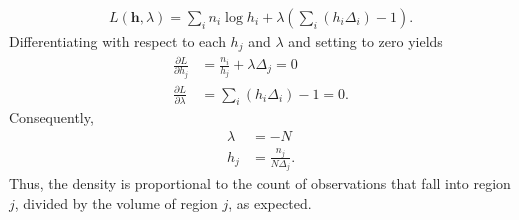\documentclass[]{article}
\begin{document}
\begin{enumerate}
	\begin{align*}
	L(\mathbf{h}, \lambda) = \sum_{i} n_i \log h_i + \lambda \left( \sum_{i}(h_i\Delta_i) - 1 \right).
	\end{align*}
	Differentiating with respect to each $h_j$ and $\lambda$ and setting to zero yields
	\begin{align*}
	\frac{\partial L}{\partial h_j} &= \frac{n_i}{h_j} + \lambda \Delta_j = 0 \\
	\frac{\partial L}{\partial \lambda} &= \sum_{i}(h_i\Delta_i) - 1 = 0.
	\end{align*}
	Consequently,
	\begin{align*}
	\lambda &= -N \\
	h_j &= \frac{n_j}{N \Delta_j}.
	\end{align*}
	Thus, the density is proportional to the count of observations that fall into region $j$, divided by the volume of region $j$, as expected.
\end{enumerate}
\end{document}
